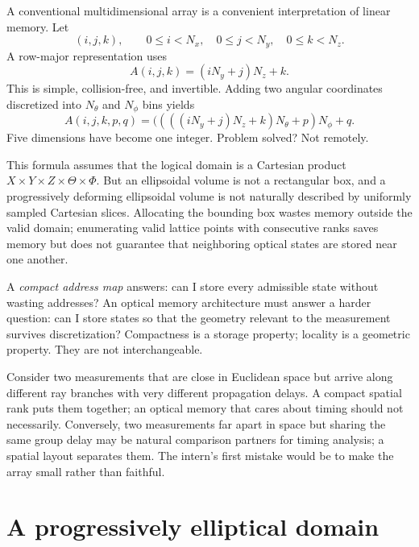 \documentclass[11pt]{article}
\begin{document}
A conventional multidimensional array is a convenient interpretation of linear memory.
Let
\begin{equation}
(i,j,k), \qquad 0 \le i < N_x, \quad 0 \le j < N_y, \quad 0 \le k < N_z.
\end{equation}
A row-major representation uses
\begin{equation}
A(i,j,k) = (iN_y + j)N_z + k.
\end{equation}
This is simple, collision-free, and invertible. Adding two angular coordinates
discretized into $N_\theta$ and $N_\phi$ bins yields
\begin{equation}
A(i,j,k,p,q) = ((((iN_y+j)N_z+k)N_\theta+p)N_\phi+q.
\end{equation}
Five dimensions have become one integer. Problem solved? Not remotely.

This formula assumes that the logical domain is a Cartesian product
$X \times Y \times Z \times \Theta \times \Phi$. But an ellipsoidal volume is not a
rectangular box, and a progressively deforming ellipsoidal volume is not naturally
described by uniformly sampled Cartesian slices. Allocating the bounding box wastes
memory outside the valid domain; enumerating valid lattice points with consecutive
ranks saves memory but does not guarantee that neighboring optical states are stored
near one another.

A \emph{compact address map} answers: can I store every admissible state without
wasting addresses? An optical memory architecture must answer a harder question: can I
store states so that the geometry relevant to the measurement survives discretization?
Compactness is a storage property; locality is a geometric property. They are not
interchangeable.

Consider two measurements that are close in Euclidean space but arrive along different
ray branches with very different propagation delays. A compact spatial rank puts them
together; an optical memory that cares about timing should not necessarily. Conversely,
two measurements far apart in space but sharing the same group delay may be natural
comparison partners for timing analysis; a spatial layout separates them. The intern's
first mistake would be to make the array small rather than faithful.

\section{A progressively elliptical domain}\label{sec:domain}
\end{document}
